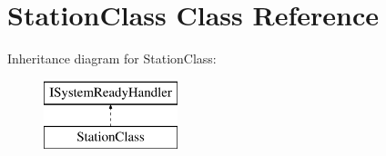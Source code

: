 \hypertarget{class_station_class}{}\section{Station\+Class Class Reference}
\label{class_station_class}
Inheritance diagram for Station\+Class\+:\begin{figure}[H]
\begin{center}
\leavevmode
\includegraphics[height=2.000000cm]{class_station_class}
\end{center}
\end{figure}
